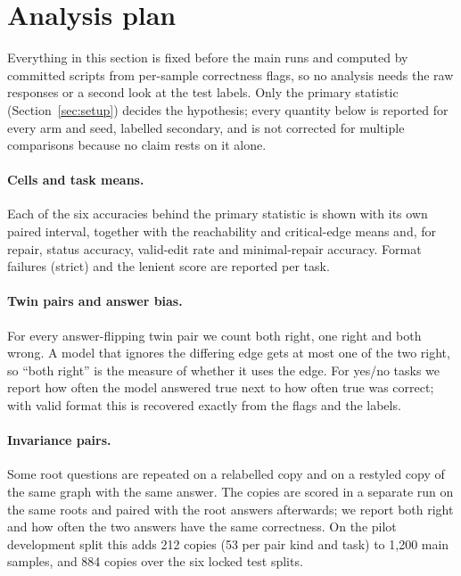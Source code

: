 \section{Analysis plan}
\label{sec:analysis}

Everything in this section is fixed before the main runs and computed by committed scripts
from per-sample correctness flags, so no analysis needs the raw responses or a second look
at the test labels. Only the primary statistic (Section~\ref{sec:setup}) decides the
hypothesis; every quantity below is reported for every arm and seed, labelled secondary, and
is not corrected for multiple comparisons because no claim rests on it alone.

\paragraph{Cells and task means.}
Each of the six accuracies behind the primary statistic is shown with its own paired
interval, together with the reachability and critical-edge means and, for repair, status
accuracy, valid-edit rate and minimal-repair accuracy. Format failures (strict) and the
lenient score are reported per task.

\paragraph{Twin pairs and answer bias.}
For every answer-flipping twin pair we count both right, one right and both wrong. A model
that ignores the differing edge gets at most one of the two right, so ``both right'' is the
measure of whether it uses the edge. For yes/no tasks we report how often the model answered
true next to how often true was correct; with valid format this is recovered exactly from the
flags and the labels.

\paragraph{Invariance pairs.}
Some root questions are repeated on a relabelled copy and on a restyled copy of the same
graph with the same answer. The copies are scored in a separate run on the same roots and
paired with the root answers afterwards; we report both right and how often the two answers
have the same correctness. On the pilot development split this adds 212 copies (53 per pair
kind and task) to 1{,}200 main samples, and 884 copies over the six locked test splits.

